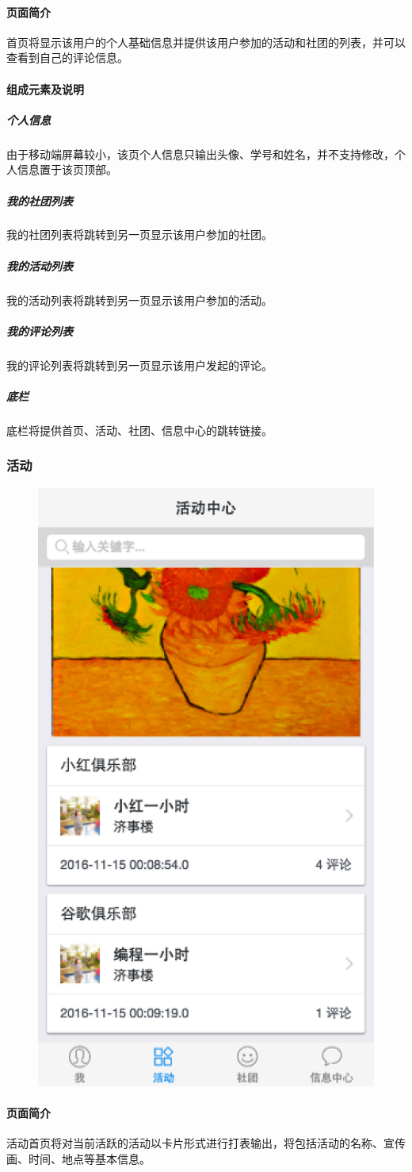 \documentclass[UTF8]{ctexart}
\begin{document}
\paragraph{页面简介}
首页将显示该用户的个人基础信息并提供该用户参加的活动和社团的列表，并可以查看到自己的评论信息。

\paragraph{组成元素及说明}
\subparagraph*{个人信息}
由于移动端屏幕较小，该页个人信息只输出头像、学号和姓名，并不支持修改，个人信息置于该页顶部。
\subparagraph*{我的社团列表}
我的社团列表将跳转到另一页显示该用户参加的社团。
\subparagraph*{我的活动列表}
我的活动列表将跳转到另一页显示该用户参加的活动。
\subparagraph*{我的评论列表}
我的评论列表将跳转到另一页显示该用户发起的评论。
\subparagraph*{底栏}
底栏将提供首页、活动、社团、信息中心的跳转链接。

\subsubsection{活动}
\begin{figure}[H]
\centering
\includegraphics[width = .5\textwidth]{tong-activity-home.png}
\end{figure}
\paragraph{页面简介}
活动首页将对当前活跃的活动以卡片形式进行打表输出，将包括活动的名称、宣传画、时间、地点等基本信息。
\end{document}
